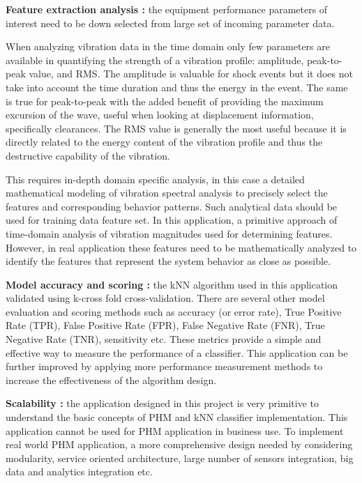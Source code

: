\documentclass[sigconf]{acmart}
\begin{document}
\textbf{Feature extraction analysis :} the equipment performance parameters of interest need to be down selected from large set of incoming parameter data. 


When analyzing vibration data in the time domain only few parameters are available in quantifying the strength of a vibration profile: amplitude, peak-to-peak value, and RMS.  
The amplitude is valuable for shock events but it does not take into account the time duration and thus the energy in the event. The same is true for peak-to-peak with the added benefit of providing the maximum excursion of the wave, useful when looking at displacement information, specifically clearances. The RMS value is generally the most useful because it is directly related to the energy content of the vibration profile and thus the destructive capability of the vibration.


This requires in-depth domain specific analysis, in this case a detailed mathematical modeling of vibration spectral analysis to precisely select the features and corresponding behavior patterns. Such analytical data should be used for training data feature set. In this application, a primitive approach of time-domain analysis of vibration magnitudes used for determining features. However, in real application these features need to be mathematically analyzed to identify the features that represent the system behavior as close as possible.

\textbf{Model accuracy and scoring :} the kNN algorithm used in this application validated using k-cross fold cross-validation. There are several other model evaluation and scoring methods such as accuracy (or error rate), True Positive Rate (TPR), False Positive Rate (FPR), False Negative Rate (FNR), True Negative Rate (TNR), sensitivity etc. These metrics provide a simple and effective way to measure the performance of a classifier. This application can be further improved by applying more performance measurement methods to increase the effectiveness of the algorithm design.   

\textbf{Scalability :} the application designed in this project is very primitive to understand the basic concepts of PHM and kNN classifier implementation. This application cannot be used for PHM application in business use. To implement real world PHM application, a more comprehensive design needed by considering modularity, service oriented architecture, large number of sensors integration, big data and analytics integration etc.
\end{document}
